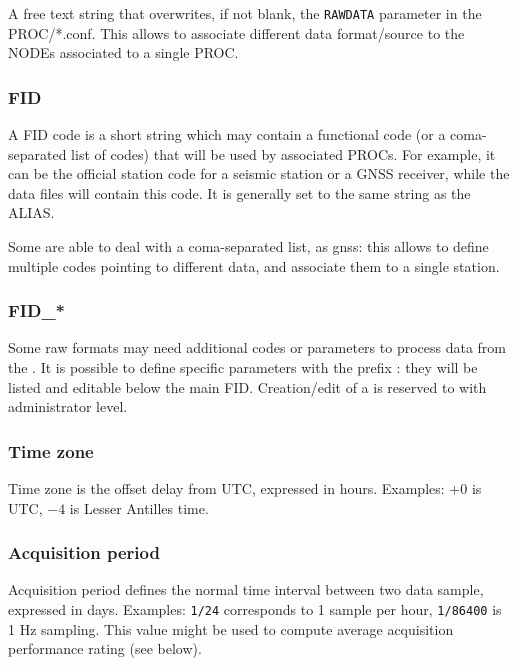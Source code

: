 A free text string that overwrites, if not blank, the \texttt{RAWDATA} parameter in the PROC/*.conf. This allows to associate different data format/source to the NODEs associated to a single PROC.


\subsubsection{FID}

A FID code is a short string which may contain a functional code (or a coma-separated list of codes) that will be used by associated PROCs. For example, it can be the official station code for a seismic station or a GNSS receiver, while the data files will contain this code. It is generally set to the same string as the ALIAS.

Some  are able to deal with a coma-separated list, as gnss: this allows to define multiple codes pointing to different data, and associate them to a single station.

\subsubsection{FID\_*}

Some raw formats may need additional codes or parameters to process data from the . It is possible to define specific parameters with the prefix : they will be listed and editable below the main FID. Creation/edit of a  is reserved to  with administrator level.


\subsubsection{Time zone}

Time zone is the offset delay from UTC, expressed in hours. Examples: $+0$ is UTC, $-4$ is Lesser Antilles time.

\subsubsection{Acquisition period}

Acquisition period defines the normal time interval between two data sample, expressed in days. Examples: \texttt{1/24} corresponds to 1 sample per hour, \texttt{1/86400} is 1 Hz sampling. This value might be used to compute average acquisition performance rating (see below).

